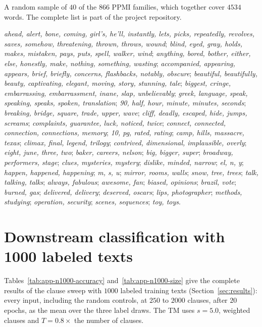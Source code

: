 A random sample of $40$ of the $866$ PPMI families, which together cover $4534$ words. The complete list is part of the project repository.

\begingroup\small\raggedright\sloppy
\textit{ahead, alert, bone, coming, girl's, he'll, instantly, lets, picks, repeatedly, revolves, saves, somehow, threatening, thrown, throws, wound};
\textit{blind, eyed, gray, holds, makes, mistaken, pays, puts, spell, walker, wind};
\textit{anything, bored, bother, either, else, honestly, make, nothing, something, wasting};
\textit{accompanied, appearing, appears, brief, briefly, concerns, flashbacks, notably, obscure};
\textit{beautiful, beautifully, beauty, captivating, elegant, moving, story, stunning, tale};
\textit{biggest, cringe, embarrassing, embarrassment, inane, slap, unbelievably};
\textit{greek, language, speak, speaking, speaks, spoken, translation};
\textit{90, half, hour, minute, minutes, seconds};
\textit{breaking, bridge, square, trade, upper, wave};
\textit{cliff, deadly, escaped, hide, jumps, screams};
\textit{complaints, guarantee, luck, noticed, twice};
\textit{connect, connected, connection, connections, memory};
\textit{10, pg, rated, rating};
\textit{camp, hills, massacre, texas};
\textit{climax, final, legend, trilogy};
\textit{contrived, dimensional, implausible, overly};
\textit{eight, june, three, two};
\textit{baker, careers, nelson};
\textit{big, bigger, super};
\textit{broadway, performers, stage};
\textit{clues, mysteries, mystery};
\textit{dislike, minded, narrow};
\textit{el, n, y};
\textit{happen, happened, happening};
\textit{m, s, u};
\textit{mirror, rooms, walls};
\textit{snow, tree, trees};
\textit{talk, talking, talks};
\textit{always, fabulous};
\textit{awesome, fan};
\textit{biased, opinions};
\textit{brazil, vote};
\textit{burned, gas};
\textit{delivered, delivery};
\textit{deserved, oscars};
\textit{lips, photographer};
\textit{methods, studying};
\textit{operation, security};
\textit{scenes, sequences};
\textit{toy, toys}.
\par\endgroup

\section{Downstream classification with 1000 labeled texts}
\label{app:n1000}

Tables~\ref{tab:app-n1000-accuracy} and~\ref{tab:app-n1000-size} give the complete results of the
clause sweep with $1000$ labeled training texts (Section~\ref{sec:results}): every input,
including the random controls, at $250$ to $2000$ clauses, after $20$ epochs, as the mean over the
three label draws. The TM uses $s = 5.0$, weighted clauses and $T = 0.8 \times$ the number of
clauses.

